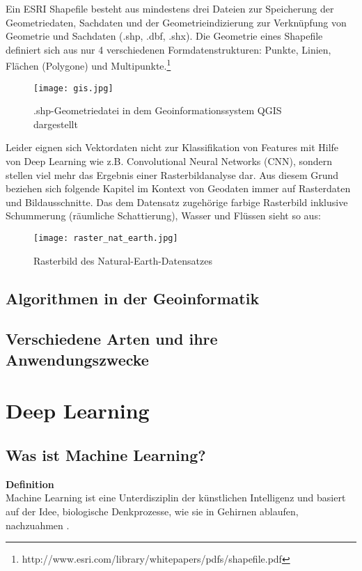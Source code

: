 \documentclass[11pt,ceqn]{book}
\begin{document}
Ein ESRI Shapefile besteht aus mindestens drei Dateien zur Speicherung der Geometriedaten, Sachdaten und der Geometrieindizierung zur Verknüpfung von Geometrie und Sachdaten (.shp, .dbf, .shx). Die Geometrie eines Shapefile definiert sich aus nur 4 verschiedenen Formdatenstrukturen: Punkte, Linien, Flächen (Polygone) und Multipunkte.\footnote{http://www.esri.com/library/whitepapers/pdfs/shapefile.pdf}

\begin{figure}[H]
\centering
\texttt{[image: gis.jpg]}
\caption{.shp-Geometriedatei in dem Geoinformationssystem QGIS dargestellt \protect\footnotemark}
\end{figure}
Leider eignen sich Vektordaten nicht zur Klassifikation von Features mit Hilfe von Deep Learning wie z.B. Convolutional Neural Networks (CNN), sondern stellen viel mehr das Ergebnis einer Rasterbildanalyse dar. Aus diesem Grund beziehen sich folgende Kapitel im Kontext von Geodaten immer auf Rasterdaten und Bildausschnitte.
\newline
Das dem Datensatz zugehörige farbige Rasterbild inklusive Schummerung (räumliche Schattierung), Wasser und Flüssen sieht so aus:

\begin{figure}[H]
\centering
\texttt{[image: raster\_nat\_earth.jpg]}
\caption{Rasterbild des Natural-Earth-Datensatzes \protect\footnotemark}
\end{figure}

\section{Algorithmen in der Geoinformatik}
\section{Verschiedene Arten und ihre Anwendungszwecke}


\chapter{Deep Learning}

\section{Was ist Machine Learning?}
\textbf{Definition}\\
Machine Learning ist eine Unterdisziplin der künstlichen Intelligenz und basiert auf der Idee, biologische Denkprozesse, wie sie in Gehirnen ablaufen, nachzuahmen \cite{geofront}.
\end{document}
